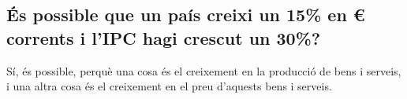 \subsection{És possible que un país creixi un 15\% en € corrents i
l’IPC hagi crescut un 30\%?}

Sí, és possible, perquè una cosa és el creixement en la producció de bens i
serveis, i una altra cosa és el creixement en el preu d'aquests bens i
serveis.
